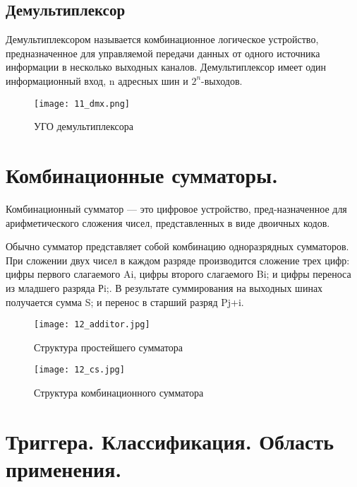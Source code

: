 \subsection*{Демультиплексор}

Демультиплексором называется комбинационное логическое устройство, предназначенное для управляемой передачи данных от одного источника информации в несколько выходных каналов. Демультиплексор имеет один информационный вход, n адресных шин и $2^{n}$-выходов.
\begin{figure}[H]
\centering
\texttt{[image: 11\_dmx.png]}
\caption{УГО демультиплексора}
\label{fig:11_dmx}
\end{figure}


\section{Комбинационные сумматоры.}

Комбинационный сумматор --- это цифровое устройство, пред-назначенное для арифметического сложения чисел, представленных в виде двоичных кодов.

Обычно сумматор представляет собой комбинацию одноразрядных сумматоров. При сложении двух чисел в каждом разряде производится сложение трех цифр: цифры первого слагаемого Ai, цифры второго слагаемого Bi; и цифры переноса из младшего разряда Рi;. В результате суммирования на выходных шинах получается сумма S; и перенос в старший разряд Pj+i.

\begin{figure}[H]
\centering
\texttt{[image: 12\_additor.jpg]}
\caption{Структура простейшего сумматора}
\label{fig:12_additor}
\end{figure}

\begin{figure}[H]
\centering
\texttt{[image: 12\_cs.jpg]}
\caption{Структура комбинационного сумматора}
\label{fig:12_cs}
\end{figure}


\section{Триггера. Классификация. Область применения.}

